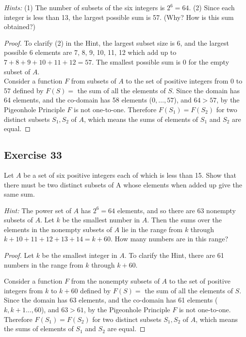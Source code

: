 \documentclass[14pt]{extarticle}
\begin{document}
{\it Hints:} (1) The number of subsets of the six integers
is \(2^6 = 64\). (2) Since each integer is less than 13, 
the largest possible sum is 57. (Why? How is this sum obtained?)

\begin{proof}
To clarify (2) in the Hint, the largest subset size is 6, and the largest possible 6 elements are 7, 8, 9, 10, 11, 12
which add up to \(7+8+9+10+11+12 = 57\). The smallest possible sum is 0 for the empty subset of \(A\). \\
Consider a function \(F\) from subsets of \(A\) to the set of positive integers from 0 to 57 defined by \(F(S) = \) 
the sum of all the elements of \(S\). Since the domain has 64 elements, and the co-domain has 58 elements (\(0,\ldots, 
57\)), and  \(64 > 57\), by the Pigeonhole Principle \(F\) is not one-to-one. Therefore \(F(S_1) = F(S_2)\) for two 
distinct subsets \(S_1, S_2\) of \(A\), which means the sums of elements of \(S_1\) and \(S_2\) are equal.
\end{proof}

\subsection{Exercise 33}
Let \(A\) be a set of six positive integers each of which is less than 15. Show that there must be two distinct 
subsets of A whose elements when added up give the same sum. 

{\it Hint:} The power set of \(A\) has \(2^6 = 64\) elements, and so there are 63 nonempty subsets of \(A\). 
Let \(k\) be the smallest number in \(A\). Then the sums over the elements in the nonempty subsets of \(A\) lie in 
the range from \(k\) through \(k + 10 + 11 + 12 + 13 + 14 = k + 60\). How many numbers are in this range?

\begin{proof}
Let \(k\) be the smallest integer in \(A\). To clarify the Hint, there are 61 numbers in the range from \(k\) through 
\(k+60\). 

Consider a function \(F\) from the nonempty subsets of \(A\) to the set of positive integers from \(k\) to \(k+60\) 
defined by \(F(S) = \) the sum of all the elements of \(S\). Since the domain has 63 elements, and the co-domain 
has 61 elements (\(k, k+1 \ldots, 60\)), and \(63 > 61\), by the Pigeonhole Principle \(F\) is not one-to-one. 
Therefore \(F(S_1) = F(S_2)\) for two distinct subsets \(S_1, S_2\) of \(A\), which means the sums of elements of 
\(S_1\) and \(S_2\) are equal.
\end{proof}
\end{document}

